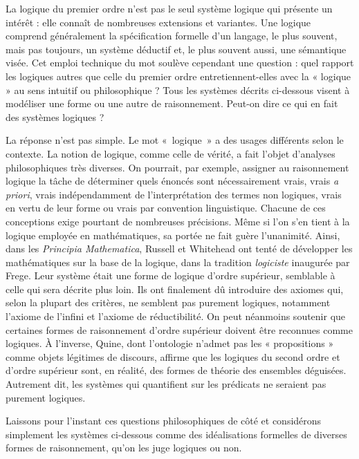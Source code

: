 \documentclass[../../../include/open-logic-section]{subfiles}
\begin{document}


La logique du premier ordre n'est pas le seul système logique qui
présente un intérêt : elle connaît de nombreuses extensions et
variantes. Une logique comprend généralement la spécification
formelle d'un langage, le plus souvent, mais pas toujours, un système
déductif et, le plus souvent aussi, une sémantique visée. Cet emploi
technique du mot soulève cependant une question : quel rapport les
logiques autres que celle du premier ordre entretiennent-elles avec
la « logique » au sens intuitif ou philosophique ? Tous les systèmes
décrits ci-dessous visent à modéliser une forme ou une autre de
raisonnement. Peut-on dire ce qui en fait des systèmes logiques ?

La réponse n'est pas simple. Le mot «~logique~» a des usages différents
selon le contexte. La notion de logique, comme celle de vérité, a fait
l'objet d'analyses philosophiques très diverses. On pourrait, par exemple, assigner au raisonnement
logique la tâche de déterminer quels énoncés sont nécessairement
vrais, vrais \emph{a priori}, vrais indépendamment de
l'interprétation des termes non logiques, vrais en vertu de leur
forme ou vrais par convention linguistique. Chacune de ces
conceptions exige pourtant de nombreuses précisions. Même si l'on
s'en tient à la logique employée en mathématiques, sa portée ne fait
guère l'unanimité. Ainsi, dans les \textit{Principia Mathematica},
Russell et Whitehead ont tenté de développer les mathématiques sur la
base de la logique, dans la tradition {\em logiciste} inaugurée par
Frege. Leur système était une forme de logique d'ordre supérieur,
semblable à celle qui sera décrite plus loin. Ils ont finalement dû
introduire des axiomes qui, selon la plupart des critères, ne semblent
pas purement logiques, notamment l'axiome de l'infini et l'axiome de
réductibilité. On peut néanmoins soutenir que certaines formes de
raisonnement d'ordre supérieur doivent être reconnues comme logiques.
À l'inverse, Quine, dont l'ontologie n'admet pas les « propositions »
comme objets légitimes de discours, affirme que les logiques du
second ordre et d'ordre supérieur sont, en réalité, des formes de
théorie des ensembles déguisées. Autrement dit, les systèmes qui
quantifient sur les prédicats ne seraient pas purement logiques.

Laissons pour l'instant ces questions philosophiques de côté et
considérons simplement les systèmes ci-dessous comme des
idéalisations formelles de diverses formes de raisonnement, qu'on
les juge logiques ou non.
\end{document}
